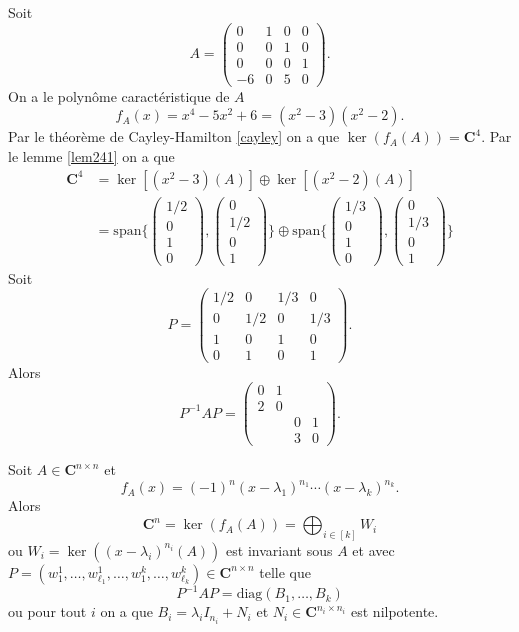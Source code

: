 \begin{example}
Soit
$$
A=\begin{pmatrix}
0 & 1 & 0 & 0 \\
0 & 0 & 1 & 0 \\
0 & 0 & 0 & 1 \\
-6 & 0 & 5 & 0
\end{pmatrix}.
$$
On a le polynôme caractéristique de $A$
$$
f_{A}(x)=x^{4}-5x^{2}+6=(x^{2}-3)(x^{2}-2).
$$
Par le théorème de Cayley-Hamilton \ref{cayley} on a que $\ker(f_{A}(A))=\mathbf{C}^{4}$. Par le lemme \ref{lem241} on a que
\begin{align*}
\mathbf{C}^{4} & =\ker[(x^{2}-3)(A)]\oplus \ker[(x^{2}-2)(A)] \\
 & =\mathrm{span}\{ \begin{pmatrix}
1/2 \\
0 \\
1 \\
0
\end{pmatrix} ,\begin{pmatrix}
0 \\
1/2 \\
0 \\
1
\end{pmatrix}\}\oplus \mathrm{span}\{ \begin{pmatrix}
1/3 \\
0 \\
1 \\
0
\end{pmatrix},\begin{pmatrix}
0 \\
1/3 \\
0 \\
1
\end{pmatrix} \}
\end{align*}
Soit 
$$
P=\begin{pmatrix}
1/2  & 0 & 1/3 & 0 \\
0 & 1/2 & 0 & 1/3 \\
1 & 0 & 1 & 0 \\
0 & 1 & 0 & 1
\end{pmatrix}.
$$
Alors
$$
P^{-1}AP=\begin{pmatrix}
0 & 1 \\
2 & 0 \\
 &  & 0 & 1 \\
 &  & 3 & 0
\end{pmatrix}.
$$

\end{example}
\begin{theorem}
Soit $A\in \mathbf{C}^{n\times n}$ et
$$
f_{A}(x)=(-1)^{n}(x-\lambda_{1})^{n_{1}}\cdots(x-\lambda _{k})^{n_{k}}.
$$
Alors $$\mathbf{C}^{n}=\ker(f_{A}(A))=\bigoplus _{i\in[k]} W_{i}$$ ou $W_{i}=\ker((x-\lambda _{i})^{n_{i}}(A))$ est invariant sous $A$ et avec $P=(w_{1}^{1},\dots,w_{\ell_{1}}^{1},\dots,w_{1}^{k},\dots,w_{\ell_{k}}^{k})\in \mathbf{C}^{n\times n}$ telle que
$$
P^{-1}AP=\mathrm{diag}(B_{1},\dots,B_{k})
$$
ou pour tout $i$ on a que $B_{i}=\lambda _{i}I_{n_{i}}+N_{i}$ et $N_{i}\in \mathbf{C}^{n_{i}\times n_{i}}$ est nilpotente.
\end{theorem}
